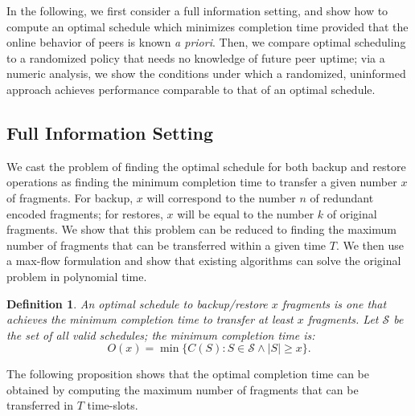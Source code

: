 \documentclass[conference,10pt]{IEEEtran}
\newtheorem{definition}{Definition}
\begin{document}
In the following, we first consider a full information setting, and
show how to compute an optimal schedule which minimizes completion
time provided that the online behavior of peers is known \emph{a
priori}. Then, we compare optimal scheduling to a randomized policy
that needs no knowledge of future peer uptime; via a numeric analysis,
we show the conditions under which a randomized, uninformed approach
achieves performance comparable to that of an optimal schedule.

\subsection{Full Information Setting}

We cast the problem of finding the optimal schedule for both backup
and restore operations as finding the minimum completion time to
transfer a given number $x$ of fragments. For backup, $x$ will
correspond to the number $n$ of redundant encoded fragments; for
restores, $x$ will be equal to the number $k$ of original
fragments. We show that this problem can be reduced to finding the
maximum number of fragments that can be transferred within a given
time $T$. We then use a max-flow formulation and show that existing
algorithms can solve the original problem in polynomial time.

\begin{definition}
	
	An \emph{optimal schedule} to backup/restore $x$ fragments is one that achieves the minimum completion time to transfer at least $x$ fragments. Let $\mathcal S$ be the set of all valid schedules; the minimum completion time is: 
	\begin{equation}
		O(x)=\min\{C(S):S\in \mathcal S\land|S|\geq x\}. \label{eq:mintime} 
	\end{equation}
\end{definition}

The following proposition shows that the optimal completion time can be obtained by computing the maximum number of fragments that can be transferred in $T$ time-slots. 
\end{document}
